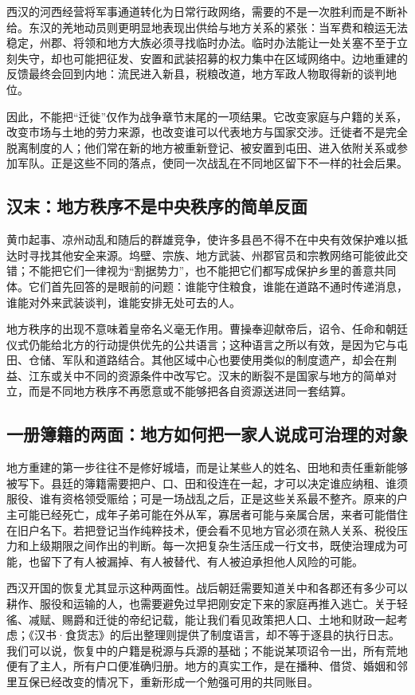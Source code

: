 西汉的河西经营将军事通道转化为日常行政网络，需要的不是一次胜利而是不断补给。东汉的羌地动员则更明显地表现出供给与地方关系的紧张：当军费和粮运无法稳定，州郡、将领和地方大族必须寻找临时办法。临时办法能让一处关塞不至于立刻失守，却也可能把征发、安置和武装招募的权力集中在区域网络中。边地重建的反馈最终会回到内地：流民进入新县，税粮改道，地方军政人物取得新的谈判地位。

因此，不能把“迁徙”仅作为战争章节末尾的一项结果。它改变家庭与户籍的关系，改变市场与土地的劳力来源，也改变谁可以代表地方与国家交涉。迁徙者不是完全脱离制度的人；他们常在新的地方被重新登记、被安置到屯田、进入依附关系或参加军队。正是这些不同的落点，使同一次战乱在不同地区留下不一样的社会后果。

\subsection{汉末：地方秩序不是中央秩序的简单反面}

黄巾起事、凉州动乱和随后的群雄竞争，使许多县邑不得不在中央有效保护难以抵达时寻找其他安全来源。坞壁、宗族、地方武装、州郡官员和宗教网络可能彼此交错；不能把它们一律视为“割据势力”，也不能把它们都写成保护乡里的善意共同体。它们首先回答的是眼前的问题：谁能守住粮食，谁能在道路不通时传递消息，谁能对外来武装谈判，谁能安排无处可去的人。

地方秩序的出现不意味着皇帝名义毫无作用。曹操奉迎献帝后，诏令、任命和朝廷仪式仍能给北方的行动提供优先的公共语言；这种语言之所以有效，是因为它与屯田、仓储、军队和道路结合。其他区域中心也要使用类似的制度遗产，却会在荆益、江东或关中不同的资源条件中改写它。汉末的断裂不是国家与地方的简单对立，而是不同地方秩序不再愿意或不能够把各自资源送进同一套结算。

\subsection{一册簿籍的两面：地方如何把一家人说成可治理的对象}

地方重建的第一步往往不是修好城墙，而是让某些人的姓名、田地和责任重新能够被写下。县廷的簿籍需要把户、口、田和役连在一起，才可以决定谁应纳租、谁须服役、谁有资格领受赈给；可是一场战乱之后，正是这些关系最不整齐。原来的户主可能已经死亡，成年子弟可能在外从军，寡居者可能与亲属合居，来者可能借住在旧户名下。若把登记当作纯粹技术，便会看不见地方官必须在熟人关系、税役压力和上级期限之间作出的判断。每一次把复杂生活压成一行文书，既使治理成为可能，也留下了有人被漏掉、有人被替代、有人被迫承担他人风险的可能。

西汉开国的恢复尤其显示这种两面性。战后朝廷需要知道关中和各郡还有多少可以耕作、服役和运输的人，也需要避免过早把刚安定下来的家庭再推入逃亡。关于轻徭、减赋、赐爵和迁徙的帝纪记载，能让我们看见政策把人口、土地和财政一起考虑；《汉书·食货志》的后出整理则提供了制度语言，却不等于逐县的执行日志。我们可以说，恢复中的户籍是税源与兵源的基础；不能说某项诏令一出，所有荒地便有了主人，所有户口便准确归册。地方的真实工作，是在播种、借贷、婚姻和邻里互保已经改变的情况下，重新形成一个勉强可用的共同账目。


